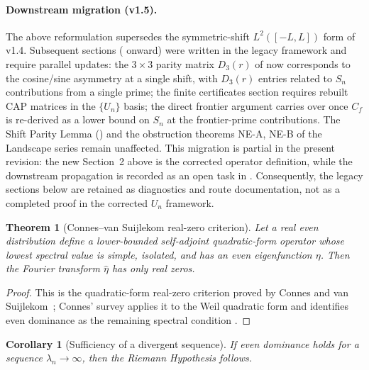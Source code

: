 \documentclass[11pt,a4paper]{article}
\newtheorem{theorem}{Theorem}[section]
\newtheorem{corollary}[corollary]{Corollary}
\theoremstyle{remark}
\theoremstyle{plain}
\begin{document}
\paragraph{Downstream migration (v1.5).}  The above
reformulation supersedes the symmetric-shift $L^2([-L,L])$ form
of v1.4.  Subsequent sections ( onward) were
written in the legacy framework and require parallel updates: the
$3\times 3$ parity matrix $D_3(r)$ of  now
corresponds to the cosine/sine asymmetry at a single shift, with
$D_3(r)$ entries related to $S_n$ contributions from a single prime;
the finite certificates section requires rebuilt CAP matrices in the
$\{U_n\}$ basis; the direct frontier argument carries over once $C_f$
is re-derived as a lower bound on $S_n$ at the frontier-prime
contributions.  The Shift Parity Lemma () and
the obstruction theorems NE-A, NE-B of the Landscape series remain
unaffected.  This migration is partial in the present revision: the
new Section~2 above is the corrected operator definition, while the
downstream propagation is recorded as an open task in
.  Consequently, the legacy sections below are
retained as diagnostics and route documentation, not as a completed proof in
the corrected $U_n$ framework.

\begin{theorem}[Connes--van Suijlekom real-zero criterion]
\label{thm:connes}
Let a real even distribution define a lower-bounded self-adjoint quadratic-form
operator whose lowest spectral value is simple, isolated, and has an even
eigenfunction $\eta$. Then the Fourier transform $\widehat\eta$ has only real
zeros.
\end{theorem}

\begin{proof}
This is the quadratic-form real-zero criterion proved by Connes and van
Suijlekom~\cite{ConnesvS2025}; Connes' survey applies it to the Weil quadratic
form and identifies even dominance as the remaining spectral condition
\cite{Connes2026}.
\end{proof}

\begin{corollary}[Sufficiency of a divergent sequence]
\label{cor:sequence-suffices}
If even dominance holds for a sequence $\lambda_n\to\infty$, then the Riemann
Hypothesis follows.
\end{corollary}
\end{document}
